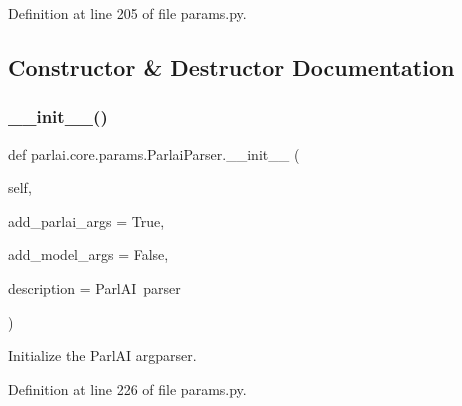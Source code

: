 Definition at line 205 of file params.\+py.



\subsection{Constructor \& Destructor Documentation}
\mbox{\label{classparlai_1_1core_1_1params_1_1ParlaiParser_ab1d55b343c804984783548bec009a695}} 
\subsubsection{\texorpdfstring{\+\_\+\+\_\+init\+\_\+\+\_\+()}{\_\_init\_\_()}}
{\footnotesize\ttfamily def parlai.\+core.\+params.\+Parlai\+Parser.\+\_\+\+\_\+init\+\_\+\+\_\+ (\begin{DoxyParamCaption}\item[{}]{self,  }\item[{}]{add\+\_\+parlai\+\_\+args = {\ttfamily True},  }\item[{}]{add\+\_\+model\+\_\+args = {\ttfamily False},  }\item[{}]{description = {\ttfamily \textquotesingle{}ParlAI~parser\textquotesingle{}} }\end{DoxyParamCaption})}

\begin{DoxyVerb}Initialize the ParlAI argparser.
\end{DoxyVerb}
 

Definition at line 226 of file params.\+py.


